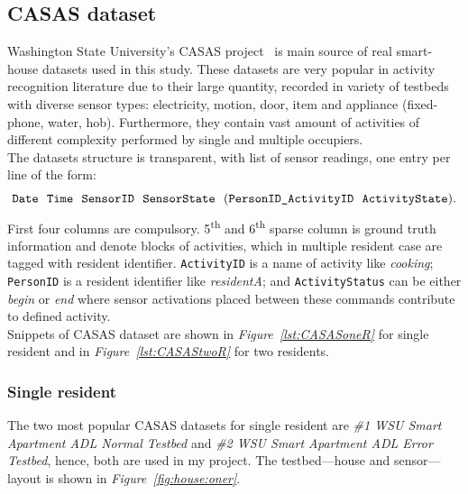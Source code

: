 \documentclass[11pt, a4paper, pdflatex, leqno, twoside, openright]{report}
\newcommand{\ts}{\textsuperscript}
\begin{document}
    \subsection{CASAS dataset\label{sec:csasDataDet}}
Washington State University's CASAS project~\citep{cook2009assessing} is main source of real smart-house datasets used in this study. These datasets are very popular in activity recognition literature due to their large quantity, recorded in variety of testbeds with diverse sensor types: electricity, motion, door, item and appliance (fixed-phone, water, hob). Furthermore, they contain vast amount of activities of different complexity performed by single and multiple occupiers.\\
The datasets structure is transparent, with list of sensor readings, one entry per line of the form:
$$
\text{\texttt{Date}~~\texttt{Time}~~\texttt{SensorID}~~\texttt{SensorState}~~(\texttt{PersonID\_ActivityID}~~\texttt{ActivityState}).}
$$
First four columns are compulsory. 5\ts{th} and 6\ts{th} sparse column is ground truth information and denote blocks of activities, which in multiple resident case are tagged with resident identifier. \texttt{ActivityID} is a name of activity like \emph{cooking}; \texttt{PersonID} is a resident identifier like \emph{residentA}; and \texttt{ActivityStatus} can be either \emph{begin} or \emph{end} where sensor activations placed between these commands contribute to defined activity.\\
Snippets of CASAS dataset are shown in \emph{Figure~\ref{lst:CASASoneR}} for single resident and in \emph{Figure~\ref{lst:CASAStwoR}} for two residents.

      \subsubsection{Single resident}
The two most popular CASAS datasets for single resident are \emph{\#1 WSU Smart Apartment ADL Normal Testbed} and \emph{\#2 WSU Smart Apartment ADL Error Testbed}, hence, both are used in my project. The testbed---house and sensor---layout is shown in \emph{Figure~\ref{fig:house:oner}}.
\end{document}
